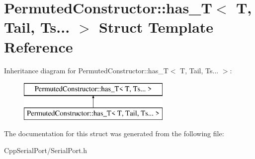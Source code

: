 \hypertarget{struct_permuted_constructor_1_1has___t_3_01_t_00_01_tail_00_01_ts_8_8_8_01_4}{}\section{Permuted\+Constructor\+:\+:has\+\_\+T$<$ T, Tail, Ts... $>$ Struct Template Reference}
\label{struct_permuted_constructor_1_1has___t_3_01_t_00_01_tail_00_01_ts_8_8_8_01_4}
Inheritance diagram for Permuted\+Constructor\+:\+:has\+\_\+T$<$ T, Tail, Ts... $>$\+:\begin{figure}[H]
\begin{center}
\leavevmode
\includegraphics[height=2.000000cm]{struct_permuted_constructor_1_1has___t_3_01_t_00_01_tail_00_01_ts_8_8_8_01_4}
\end{center}
\end{figure}


The documentation for this struct was generated from the following file\+:\begin{DoxyCompactItemize}
\item 
Cpp\+Serial\+Port/Serial\+Port.\+h\end{DoxyCompactItemize}
